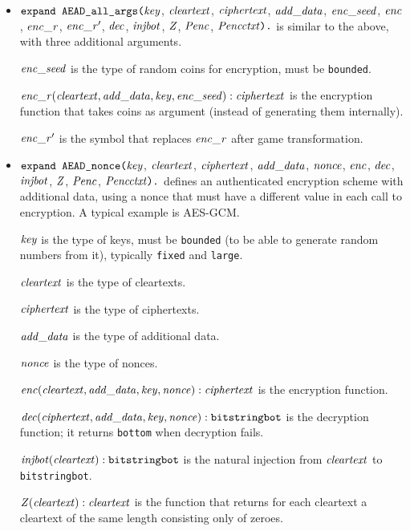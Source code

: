 \documentclass{article}
\begin{document}
\begin{itemize}
\item $\texttt{expand AEAD\_all\_args(}\mathit{key}$,
$  \mathit{cleartext}$, $\mathit{ciphertext}$, $\mathit{add\_data}$, $\mathit{enc\_seed}$, $\mathit{enc}$, $\mathit{enc\_r}$, $\mathit{enc\_r}'$,
$  \mathit{dec}$, $\mathit{injbot}$, $\mathit{Z}$, $\mathit{Penc}$, $\mathit{Pencctxt}\texttt{).}$ is similar to the above,
  with three additional arguments. 

  $\mathit{enc\_seed}$ is the type of random coins for encryption, must be \texttt{bounded}.

  $\mathit{enc\_r}(\mathit{cleartext}, \mathit{add\_data}, \mathit{key}, \mathit{enc\_seed}): \mathit{ciphertext}$ is the encryption function that takes coins as argument (instead of generating them internally).

  $\mathit{enc\_r}'$ is the symbol that replaces $\mathit{enc\_r}$ after game transformation.


\item $\texttt{expand AEAD\_nonce(}\mathit{key}$,
$  \mathit{cleartext}$, $\mathit{ciphertext}$, $\mathit{add\_data}$, $\mathit{nonce}$, $\mathit{enc}$,
$  \mathit{dec}$, $\mathit{injbot}$, $\mathit{Z}$, $\mathit{Penc}$, $\mathit{Pencctxt}\texttt{).}$ defines an
authenticated encryption scheme with additional data, using a nonce that must have a different
value in each call to encryption. A typical example is AES-GCM.

   $\mathit{key}$ is the type of keys, must be \texttt{bounded} (to be able to generate random numbers from it), typically \texttt{fixed} and \texttt{large}.

   $\mathit{cleartext}$ is the type of cleartexts.

   $\mathit{ciphertext}$ is the type of ciphertexts.

   $\mathit{add\_data}$ is the type of additional data.

   $\mathit{nonce}$ is the type of nonces.

   $\mathit{enc}(\mathit{cleartext}, \mathit{add\_data}, \mathit{key}, \mathit{nonce}): \mathit{ciphertext}$ is the encryption function. 

   $\mathit{dec}(\mathit{ciphertext}, \mathit{add\_data}, \mathit{key}, \mathit{nonce}): \texttt{bitstringbot}$ is the
  decryption function; it returns \texttt{bottom} when decryption
  fails.

   $\mathit{injbot}(\mathit{cleartext}): \texttt{bitstringbot}$ is the natural
  injection from $\mathit{cleartext}$ to \texttt{bitstringbot}.

   $\mathit{Z}(\mathit{cleartext}): \mathit{cleartext}$ is the function that
  returns for each cleartext a cleartext of the same length consisting
  only of zeroes.


\end{itemize}
\end{document}
